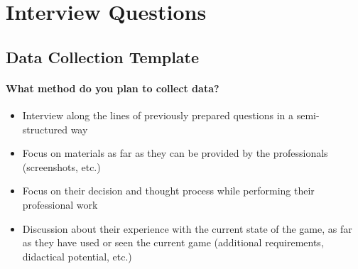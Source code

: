\section{Interview Questions}
\label{sec:appendix_interview_questions}

\subsection{Data Collection Template}

\paragraph{What method do you plan to collect data?}
\begin{itemize}
  \item Interview along the lines of previously prepared questions in a semi-structured way
  \item Focus on materials as far as they can be provided by the professionals (screenshots, etc.)
  \item Focus on their decision and thought process while performing their professional work
  \item Discussion about their experience with the current state of the game, as far as they have used or seen the current game (additional requirements, didactical potential, etc.)
\end{itemize}

